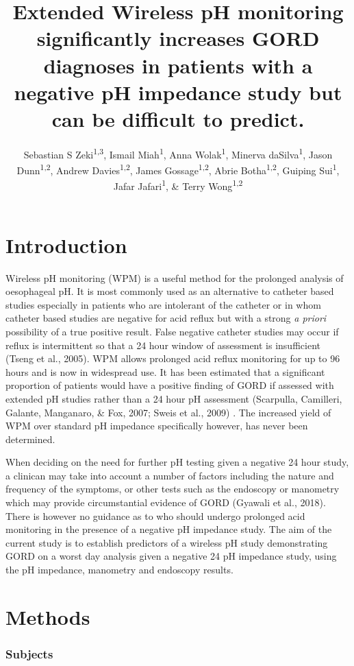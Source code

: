 \documentclass[english,man,floatsintext]{apa6}
\author{Sebastian S Zeki\textsuperscript{1,3}, Ismail Miah\textsuperscript{1}, Anna Wolak\textsuperscript{1}, Minerva daSilva\textsuperscript{1}, Jason Dunn\textsuperscript{1,2}, Andrew Davies\textsuperscript{1,2}, James Gossage\textsuperscript{1,2}, Abrie Botha\textsuperscript{1,2}, Guiping Sui\textsuperscript{1}, Jafar Jafari\textsuperscript{1}, \& Terry Wong\textsuperscript{1,2}}
\affiliation{
\vspace{0.5cm}
\textsuperscript{1} Centre for Oeosphageal Diseases, Guy's and St. Thomas Hospital, Westminster Bridge Road, London\\\textsuperscript{2} Karolinska Instituet, Karolinska,Sweden\\\textsuperscript{3} Bart's Cancer Institute,Charterhouse Square, London}
\title{Extended Wireless pH monitoring significantly increases GORD diagnoses in patients with a negative pH impedance study but can be difficult to predict.}
\date{}
\begin{document}
\maketitle

\hypertarget{introduction}{%
\section{Introduction}\label{introduction}}

Wireless pH monitoring (WPM) is a useful method for the prolonged analysis of oesophageal pH. It is most commonly used as an alternative to catheter based studies especially in patients who are intolerant of the catheter or in whom catheter based studies are negative for acid reflux but with a strong \emph{a priori} possibility of a true positive result. False negative catheter studies may occur if reflux is intermittent so that a 24 hour window of assessment is insufficient (Tseng et al., 2005). WPM allows prolonged acid reflux monitoring for up to 96 hours and is now in widespread use. It has been estimated that a significant proportion of patients would have a positive finding of GORD if assessed with extended pH studies rather than a 24 hour pH assessment (Scarpulla, Camilleri, Galante, Manganaro, \& Fox, 2007; Sweis et al., 2009) . The increased yield of WPM over standard pH impedance specifically however, has never been determined.

When deciding on the need for further pH testing given a negative 24 hour study, a clinican may take into account a number of factors including the nature and frequency of the symptoms, or other tests such as the endoscopy or manometry which may provide circumstantial evidence of GORD (Gyawali et al., 2018). There is however no guidance as to who should undergo prolonged acid monitoring in the presence of a negative pH impedance study. The aim of the current study is to establish predictors of a wireless pH study demonstrating GORD on a worst day analysis given a negative 24 pH impedance study, using the pH impedance, manometry and endoscopy results.

\hypertarget{methods}{%
\section{Methods}\label{methods}}

\hypertarget{subjects}{%
\subsubsection{Subjects}\label{subjects}}
\end{document}
